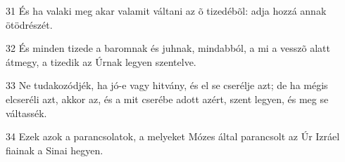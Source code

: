 \par 31 És ha valaki meg akar valamit váltani az õ tizedébõl: adja hozzá annak ötödrészét.
\par 32 És minden tizede a baromnak és juhnak, mindabból, a mi a vesszõ alatt átmegy, a tizedik az Úrnak legyen szentelve.
\par 33 Ne tudakozódjék, ha jó-e vagy hitvány, és el se cserélje azt; de ha mégis elcseréli azt, akkor az, és a mit cserébe adott azért, szent legyen, és meg se váltassék.
\par 34 Ezek azok a parancsolatok, a melyeket Mózes által parancsolt az Úr Izráel fiainak a Sinai hegyen.


